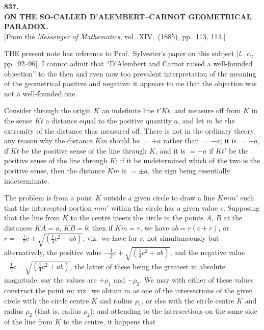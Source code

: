 \documentclass[12pt,a4paper]{article}
\theoremstyle{definition}
\begin{document}
\bigskip

\begin{center}
{\Large\textbf{837.}}\\[1em]
{\large\textbf{ON THE SO-CALLED D'ALEMBERT--CARNOT GEOMETRICAL PARADOX.}}\\[1em]
[From the \textit{Messenger of Mathematics}, vol.\ XIV.\ (1885), pp.\ 113, 114.]
\end{center}

\bigskip

\noindent THE present note has reference to Prof.\ Sylvester's paper on this subject [\textit{l.~c.}, pp.\ 92--96]. I cannot admit that ``D'Alembert and Carnot raised a well-founded objection'' to the then and even now too prevalent interpretation of the meaning of the geometrical positive and negative: it appears to me that the objection was not a well-founded one.

Consider through the origin $K$ an indefinite line $t'Kt$, and measure off from $K$ in the sense $Kt$ a distance equal to the positive quantity $a$, and let $m$ be the extremity of the distance thus measured off. There is not in the ordinary theory any reason why the distance $Km$ should be $= +a$ rather than $= -a$; it is $= +a$, if $Kt$ be the positive sense of the line through $K$, and it is $= -a$ if $Kt'$ be the positive sense of the line through $K$; if it be undetermined which of the two is the positive sense, then the distance $Km$ is $= \pm a$, the sign being essentially indeterminate.

The problem is from a point $K$ outside a given circle to draw a line $Kmm'$ such that the intercepted portion $mm'$ within the circle has a given value $c$. Supposing that the line from $K$ to the centre meets the circle in the points $A$, $B$ at the distances $KA = a$, $KB = b$: then if $Km = r$, we have $ab = r(c + r)$, or $r = -\tfrac{1}{2}c \pm \sqrt{(\tfrac{1}{4}c^2 + ab)}$; viz.\ we have for $r$, not simultaneously but alternatively, the positive value $-\tfrac{1}{2}c + \sqrt{(\tfrac{1}{4}c^2 + ab)}$, and the negative value $-\tfrac{1}{2}c - \sqrt{(\tfrac{1}{4}c^2 + ab)}$, the latter of these being the greatest in absolute magnitude; say the values are $+\rho_1$ and $-\rho_2$. We may with either of these values construct the point $m$; viz.\ we obtain $m$ as one of the intersections of the given circle with the circle centre $K$ and radius $\rho_1$, or else with the circle centre $K$ and radius $\rho_2$ (that is, radius $\rho_2$); and attending to the intersections on the same side of the line from $K$ to the centre, it happens that
\end{document}

